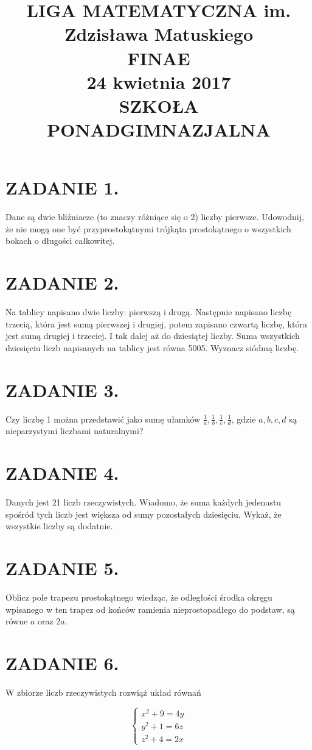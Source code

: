 \documentclass[10pt]{article}
\title{LIGA MATEMATYCZNA im. Zdzisława Matuskiego \\
 FINAE \\
 24 kwietnia 2017 \\
 SZKOŁA PONADGIMNAZJALNA }
\author{}
\date{}
\begin{document}
\maketitle
\section*{ZADANIE 1.}
Dane są dwie bliźniacze (to znaczy różniące się o 2) liczby pierwsze. Udowodnij, że nie mogą one być przyprostokątnymi trójkąta prostokątnego o wszystkich bokach o długości całkowitej.

\section*{ZADANIE 2.}
Na tablicy napisano dwie liczby: pierwszą i drugą. Następnie napisano liczbę trzecią, która jest sumą pierwszej i drugiej, potem zapisano czwartą liczbę, która jest sumą drugiej i trzeciej. I tak dalej aż do dziesiątej liczby. Suma wszystkich dziesięciu liczb napisanych na tablicy jest równa 5005. Wyznacz siódmą liczbę.

\section*{ZADANIE 3.}
Czy liczbę 1 można przedstawić jako sumę ułamków \(\frac{1}{a}, \frac{1}{b}, \frac{1}{c}, \frac{1}{d}\), gdzie \(a, b, c, d\) są nieparzystymi liczbami naturalnymi?

\section*{ZADANIE 4.}
Danych jest 21 liczb rzeczywistych. Wiadomo, że suma każdych jedenastu spośród tych liczb jest większa od sumy pozostałych dziesięciu. Wykaż, że wszystkie liczby są dodatnie.

\section*{ZADANIE 5.}
Oblicz pole trapezu prostokątnego wiedząc, że odległości środka okręgu wpisanego w ten trapez od końców ramienia nieprostopadłego do podstaw, są równe \(a\) oraz \(2 a\).

\section*{ZADANIE 6.}
W zbiorze liczb rzeczywistych rozwiąż układ równań

\[
\left\{\begin{array}{l}
x^{2}+9=4 y \\
y^{2}+1=6 z \\
z^{2}+4=2 x
\end{array}\right.
\]
\end{document}
